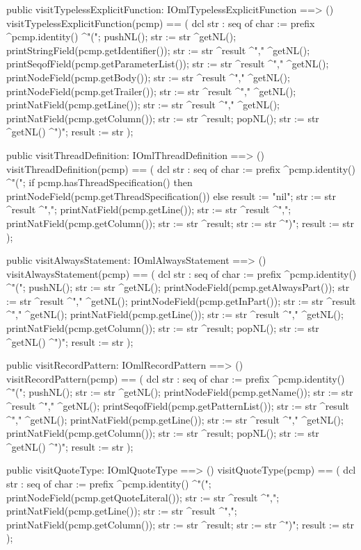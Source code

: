 \begin{vdm_al}
  public visitTypelessExplicitFunction: IOmlTypelessExplicitFunction ==> ()
  visitTypelessExplicitFunction(pcmp) ==
    ( dcl str : seq of char := prefix ^pcmp.identity() ^"(";
      pushNL();
      str := str ^getNL();
      printStringField(pcmp.getIdentifier());
      str := str ^result ^"," ^getNL();
      printSeqofField(pcmp.getParameterList());
      str := str ^result ^"," ^getNL();
      printNodeField(pcmp.getBody());
      str := str ^result ^"," ^getNL();
      printNodeField(pcmp.getTrailer());
      str := str ^result ^"," ^getNL();
      printNatField(pcmp.getLine());
      str := str ^result ^"," ^getNL();
      printNatField(pcmp.getColumn());
      str := str ^result;
      popNL();
      str := str ^getNL() ^")";
      result := str );

  public visitThreadDefinition: IOmlThreadDefinition ==> ()
  visitThreadDefinition(pcmp) ==
    ( dcl str : seq of char := prefix ^pcmp.identity() ^"(";
      if pcmp.hasThreadSpecification()
      then printNodeField(pcmp.getThreadSpecification())
      else result := "nil";
      str := str ^result ^",";
      printNatField(pcmp.getLine());
      str := str ^result ^",";
      printNatField(pcmp.getColumn());
      str := str ^result;
      str := str ^")";
      result := str );

  public visitAlwaysStatement: IOmlAlwaysStatement ==> ()
  visitAlwaysStatement(pcmp) ==
    ( dcl str : seq of char := prefix ^pcmp.identity() ^"(";
      pushNL();
      str := str ^getNL();
      printNodeField(pcmp.getAlwaysPart());
      str := str ^result ^"," ^getNL();
      printNodeField(pcmp.getInPart());
      str := str ^result ^"," ^getNL();
      printNatField(pcmp.getLine());
      str := str ^result ^"," ^getNL();
      printNatField(pcmp.getColumn());
      str := str ^result;
      popNL();
      str := str ^getNL() ^")";
      result := str );

  public visitRecordPattern: IOmlRecordPattern ==> ()
  visitRecordPattern(pcmp) ==
    ( dcl str : seq of char := prefix ^pcmp.identity() ^"(";
      pushNL();
      str := str ^getNL();
      printNodeField(pcmp.getName());
      str := str ^result ^"," ^getNL();
      printSeqofField(pcmp.getPatternList());
      str := str ^result ^"," ^getNL();
      printNatField(pcmp.getLine());
      str := str ^result ^"," ^getNL();
      printNatField(pcmp.getColumn());
      str := str ^result;
      popNL();
      str := str ^getNL() ^")";
      result := str );

  public visitQuoteType: IOmlQuoteType ==> ()
  visitQuoteType(pcmp) ==
    ( dcl str : seq of char := prefix ^pcmp.identity() ^"(";
      printNodeField(pcmp.getQuoteLiteral());
      str := str ^result ^",";
      printNatField(pcmp.getLine());
      str := str ^result ^",";
      printNatField(pcmp.getColumn());
      str := str ^result;
      str := str ^")";
      result := str );


\end{vdm_al}
